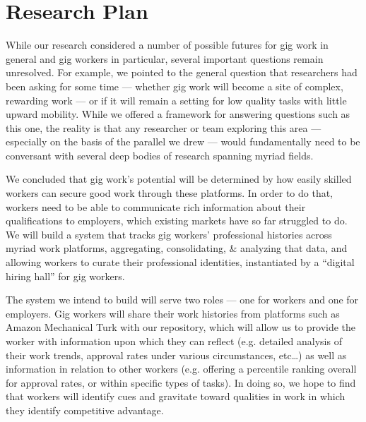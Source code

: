\documentclass{article}
\newcommand{\topic}[1]{{\color{Blue}#1}}
\renewcommand{\topic}[1]{{#1}}
\begin{document}
\section*{Research Plan}
\topic{While our research considered a number of possible futures for gig work in general and gig workers in particular,
several important questions remain unresolved.}
For example, we pointed to the general question that researchers had been asking for some time ---
whether gig work will become a site of complex, rewarding work
--- or if it will remain a setting for low quality tasks with little upward mobility.
While we offered a framework for answering questions such as this one, the reality is that
any researcher or team exploring this area
--- especially on the basis of the parallel we drew ---
would fundamentally need to be conversant with several deep bodies of research spanning myriad fields.

We concluded that gig work's potential will be determined by
how easily skilled workers can secure good work through these platforms.
In order to do that, workers need to be able to communicate rich information about their qualifications to employers,
which existing markets have so far struggled to do.
\topic{We will build a system that tracks gig workers' professional histories across myriad work platforms,
aggregating, consolidating, \& analyzing that data, and
allowing workers to curate their professional identities, instantiated by a ``digital hiring hall'' for gig workers.}


\topic{The system we intend to build will serve two roles --- one for workers and one for employers.}
Gig workers will share their work histories from platforms such as Amazon Mechanical Turk with our repository,
which will allow us to provide the worker with information upon which they can reflect
(e.g. detailed analysis of their work trends, approval rates under various circumstances, etc\dots)
as well as information in relation to other workers
(e.g. offering a percentile ranking overall for approval rates, or within specific types of tasks).
In doing so, we hope to find that workers will identify cues and gravitate toward qualities in work
in which they identify competitive advantage.
\end{document}
